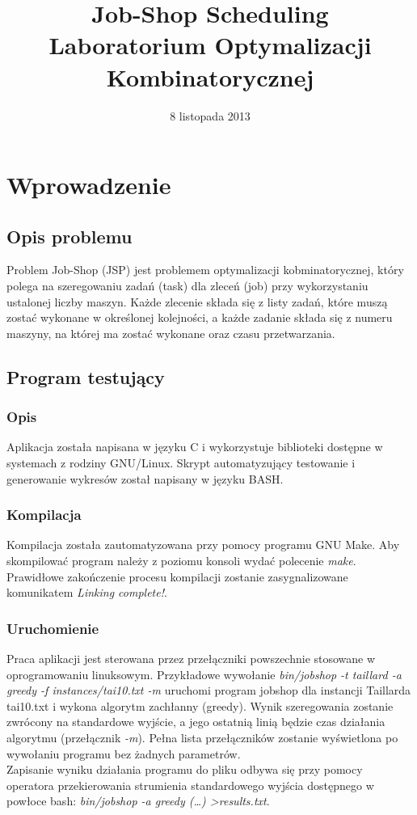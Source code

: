 \documentclass[10pt,a4paper]{article}
\author{\authorthing}
\date{8 listopada 2013}
\title{Job-Shop Scheduling\\Laboratorium Optymalizacji Kombinatorycznej}
\begin{document}
\maketitle
\section{Wprowadzenie}
\subsection{Opis problemu}
Problem Job-Shop (JSP) jest problemem optymalizacji kobminatorycznej, który polega na szeregowaniu zadań (task) dla zleceń (job) przy wykorzystaniu ustalonej liczby maszyn. Każde zlecenie składa się z listy zadań, które muszą zostać wykonane w określonej kolejności, a każde zadanie składa się z numeru maszyny, na której ma zostać wykonane oraz czasu przetwarzania.\\
\subsection{Program testujący}
\subsubsection{Opis}
Aplikacja została napisana w języku C i wykorzystuje biblioteki dostępne w systemach z rodziny GNU/Linux. Skrypt automatyzujący testowanie i generowanie wykresów został napisany w języku BASH.
\subsubsection{Kompilacja}
Kompilacja została zautomatyzowana przy pomocy programu GNU Make. Aby skompilować program należy z poziomu konsoli wydać polecenie \textit{make}. Prawidłowe zakończenie procesu kompilacji zostanie zasygnalizowane komunikatem \textit{Linking complete!}.
\subsubsection{Uruchomienie}
Praca aplikacji jest sterowana przez przełączniki powszechnie stosowane w oprogramowaniu linuksowym. Przykładowe wywołanie \textit{bin/jobshop -t taillard -a greedy -f instances/tai10.txt -m} uruchomi program jobshop dla instancji Taillarda tai10.txt i wykona algorytm zachłanny (greedy). Wynik szeregowania zostanie zwrócony na standardowe wyjście, a jego ostatnią linią będzie czas działania algorytmu (przełącznik \textit{-m}). Pełna lista przełączników zostanie wyświetlona po wywołaniu programu bez żadnych parametrów.\\
Zapisanie wyniku działania programu do pliku odbywa się przy pomocy operatora przekierowania strumienia standardowego wyjścia dostępnego w powłoce bash: \textit{bin/jobshop -a greedy (\ldots) \textgreater results.txt}.
\end{document}
